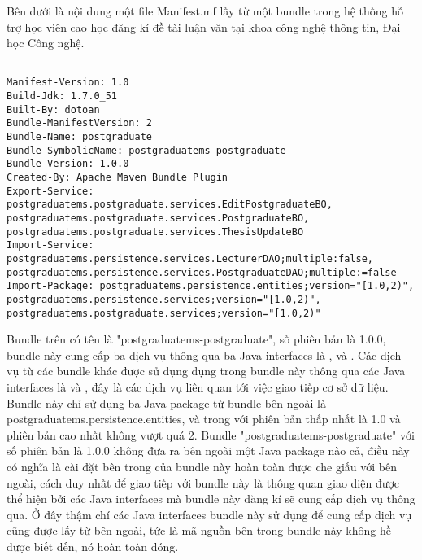 Bên dưới là nội dung một file Manifest.mf lấy từ một bundle trong hệ thống hỗ trợ học viên cao học đăng kí đề tài luận văn tại khoa công nghệ thông tin, Đại học Công nghệ.
\begin{lstlisting}[label=manifest, 
inputencoding=utf8,
breaklines=true,
basicstyle=\ttfamily\footnotesize,
caption=Nội dung của môt file manifest của OSGi bundle]

Manifest-Version: 1.0
Build-Jdk: 1.7.0_51
Built-By: dotoan
Bundle-ManifestVersion: 2
Bundle-Name: postgraduate
Bundle-SymbolicName: postgraduatems-postgraduate
Bundle-Version: 1.0.0
Created-By: Apache Maven Bundle Plugin
Export-Service: postgraduatems.postgraduate.services.EditPostgraduateBO, postgraduatems.postgraduate.services.PostgraduateBO, postgraduatems.postgraduate.services.ThesisUpdateBO
Import-Service: postgraduatems.persistence.services.LecturerDAO;multiple:false, postgraduatems.persistence.services.PostgraduateDAO;multiple:=false
Import-Package: postgraduatems.persistence.entities;version="[1.0,2)", postgraduatems.persistence.services;version="[1.0,2)", postgraduatems.postgraduate.services;version="[1.0,2)"
\end{lstlisting}


Bundle trên có tên là "postgraduatems-postgraduate", số phiên bản là 1.0.0, bundle 
này cung cấp ba dịch vụ thông qua ba Java interfaces là , 
 và 
.
Các dịch vụ từ các bundle khác được sử dụng dụng trong bundle này thông qua các Java interfaces là  và 
, 
đây là các dịch vụ liên quan tới việc giao tiếp cơ sở dữ liệu.
Bundle này chỉ sử dụng ba Java package từ bundle bên ngoài là postgraduatems.persistence.entities,  và  trong với phiên bản thấp nhất là 1.0 và phiên bản cao nhất không vượt quá 2. Bundle "postgraduatems-postgraduate" với số phiên bản là 1.0.0 không đưa ra bên ngoài một Java package nào cả, điều này có nghĩa là cài đặt bên trong của bundle này hoàn toàn được che giấu với bên ngoài, cách duy nhất để giao tiếp với bundle này là thông quan giao diện được thể hiện bởi các Java interfaces mà bundle này đăng kí sẽ cung cấp dịch vụ thông qua. Ở đây thậm chí các Java interfaces bundle này sử dụng để cung cấp dịch vụ cũng được lấy từ bên ngoài, tức là mã nguồn bên trong bundle này không hề được biết đến, nó hoàn toàn đóng. 

